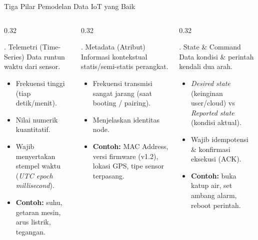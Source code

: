 \documentclass[aspectratio=169,10pt]{beamer}
\begin{document}
\begin{frame}{Tiga Pilar Pemodelan Data IoT yang Baik}
    \begin{columns}[T]
        \begin{column}{0.32\textwidth}
            \begin{block}{. Telemetri (Time-Series)}
                \scriptsize
                Data runtun waktu dari sensor.
                \begin{itemize}
                    \item Frekuensi tinggi (tiap detik/menit).
                    \item Nilai numerik kuantitatif.
                    \item Wajib menyertakan stempel waktu (\textit{UTC epoch millisecond}).
                    \item \textbf{Contoh:} suhu, getaran mesin, arus listrik, tegangan.
                \end{itemize}
            \end{block}
        \end{column}
        \begin{column}{0.32\textwidth}
            \begin{block}{. Metadata (Atribut)}
                \scriptsize
                Informasi kontekstual statis/semi-statis perangkat.
                \begin{itemize}
                    \item Frekuensi transmisi sangat jarang (saat booting / pairing).
                    \item Menjelaskan identitas node.
                    \item \textbf{Contoh:} MAC Address, versi firmware (v1.2), lokasi GPS, tipe sensor terpasang.
                \end{itemize}
            \end{block}
        \end{column}
        \begin{column}{0.32\textwidth}
            \begin{block}{. State \& Command}
                \scriptsize
                Data kondisi \& perintah kendali dua arah.
                \begin{itemize}
                    \item \textit{Desired state} (keinginan user/cloud) vs \textit{Reported state} (kondisi aktual).
                    \item Wajib idempotensi \& konfirmasi eksekusi (ACK).
                    \item \textbf{Contoh:} buka katup air, set ambang alarm, reboot perintah.
                \end{itemize}
            \end{block}
        \end{column}
    \end{columns}
\end{frame}
\end{document}
